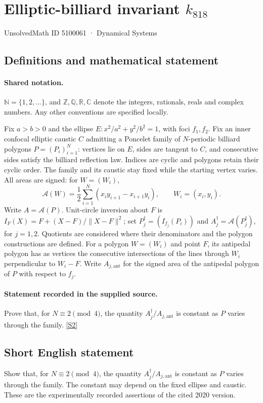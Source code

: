\documentclass[11pt]{article}
\newcommand{\sref}[2]{\hyperlink{source:#1:#2}{[S#2]}}
\begin{document}
\setcounter{section}{5100060}
\section{Elliptic-billiard invariant $k_{818}$}\label{5100061}
{\small\sffamily UnsolvedMath ID 5100061 · Dynamical Systems}
\subsection{Definitions and mathematical statement}

\paragraph{Shared notation.}$\mathbb N=\{1,2,\ldots\}$, and $\mathbb Z,\mathbb Q,\mathbb R,\mathbb C$ denote the integers, rationals, reals and complex numbers. Any other conventions are specified locally.


Fix $a>b>0$ and the ellipse $E:x^2/a^2+y^2/b^2=1$, with foci $f_1,f_2$. Fix an inner confocal elliptic caustic $C$ admitting a Poncelet family of $N$-periodic billiard polygons $P=(P_i)_{i=1}^N$: vertices lie on $E$, sides are tangent to $C$, and consecutive sides satisfy the billiard reflection law. Indices are cyclic and polygons retain their cyclic order. The family and its caustic stay fixed while the starting vertex varies. All areas are signed: for $W=(W_i)$,
\[\mathcal A(W)=\frac12\sum_{i=1}^N(x_i y_{i+1}-x_{i+1}y_i),\qquad W_i=(x_i,y_i).\]
Write $A=\mathcal A(P)$. Unit-circle inversion about $F$ is $I_F(X)=F+(X-F)/\lVert X-F\rVert^2$; set $P_j^\dagger=(I_{f_j}(P_i))$ and $A_j^\dagger=\mathcal A(P_j^\dagger)$, for $j=1,2$. Quotients are considered where their denominators and the polygon constructions are defined. For a polygon $W=(W_i)$ and point $F$, its antipedal polygon has as vertices the consecutive intersections of the lines through $W_i$ perpendicular to $W_i-F$. Write $A_{j,\mathrm{ant}}$ for the signed area of the antipedal polygon of $P$ with respect to $f_j$.
\paragraph{Statement recorded in the supplied source.}
Prove that, for $N\equiv2\pmod4$, the quantity $A_j^\dagger/A_{j,\mathrm{ant}}$ is constant as $P$ varies through the family. \sref{5100061}{2}
\subsection{Short English statement}
Show that, for $N\equiv2\pmod4$, the quantity $A_j^\dagger/A_{j,\mathrm{ant}}$ is constant as $P$ varies through the family. The constant may depend on the fixed ellipse and caustic. These are the experimentally recorded assertions of the cited 2020 version.
\end{document}
